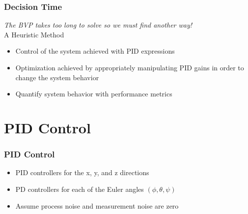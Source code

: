 \documentclass{beamer}
\begin{document}

\begin{frame}
\frametitle{Decision Time}

\textit{The BVP takes too long to solve so we must find another way!}\\

A Heuristic Method

\begin{itemize}
\item Control of the system achieved with PID expressions
\item Optimization achieved by appropriately manipulating PID gains in order to change the system behavior
\item Quantify system behavior with performance metrics
\end{itemize}

\end{frame}



\section{PID Control}


\begin{frame}
\frametitle{PID Control}


\begin{itemize}
\item PID controllers for the x, y, and z directions

\item PD controllers for each of the Euler angles $(\phi,\theta,\psi)$

\item Assume process noise and measurement noise are zero
\end{itemize}

\end{frame}



\end{document}
